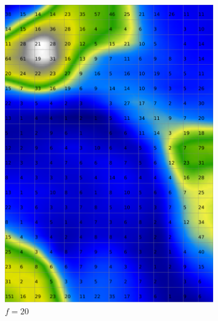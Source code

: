 \documentclass{acm_proc_article-sp}
\begin{document}
\begin{figure}
\centering
    \centering
    \begin{subfigure}[b]{0.30\linewidth}
        \includegraphics[width=\linewidth]{img/wine-weird-smoothed-data-histogram-20}
        \caption{$f=20$}
    \end{subfigure}
    \begin{subfigure}[b]{0.30\linewidth}

\end{subfigure}
\end{figure}
\end{document}
